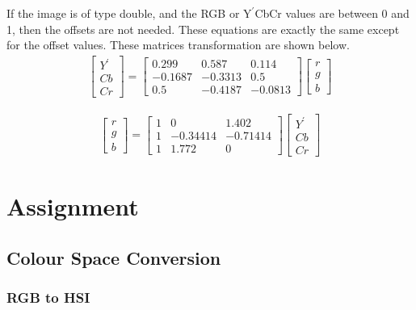 \documentclass{article}
\begin{document}
	If the image is of type double, and the RGB or $\textrm{Y}^\prime$CbCr values are between 0 and 1, then the offsets are not needed. These equations are exactly the same except for the offset values. These matrices transformation are shown below.\\
	
	\begin{align}
		\begin{bmatrix}
			Y^\prime \\
			Cb \\
			Cr
		\end{bmatrix}
		= 	
		\begin{bmatrix}
			0.299 & 0.587 & 0.114\\
			-0.1687 & -0.3313 & 0.5\\
			0.5 & -0.4187 & -0.0813
		\end{bmatrix}
		\begin{bmatrix}
			r \\
			g \\
			b
		\end{bmatrix}
	\end{align}
	
	\begin{align}
		\begin{bmatrix}
			r \\
			g \\
			b
		\end{bmatrix}
		= 	
		\begin{bmatrix}
			1 & 0 & 1.402\\
			1 & -0.34414 & -0.71414\\
			1 & 1.772 & 0
		\end{bmatrix}
		\begin{bmatrix}
			Y^\prime \\
			Cb \\
			Cr
		\end{bmatrix}
	\end{align} 
	
	\section{Assignment}
	
	\subsection{Colour Space Conversion}
	
	\subsubsection{RGB to HSI}
	
\end{document}
